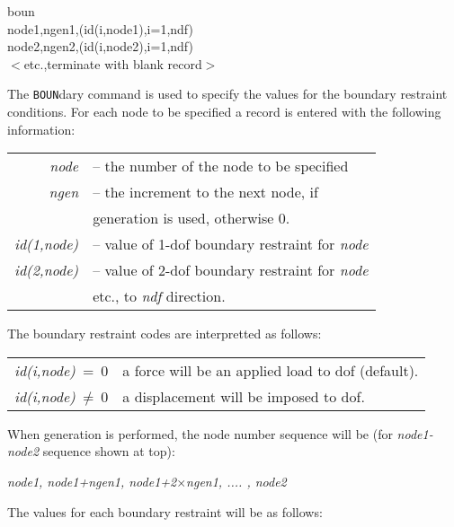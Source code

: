 \hspace{1.0cm} {{ boun \hfill}} \\{\smallskip}
\hspace{1.4cm} {{ node1,ngen1,(id(i,node1),i=1,ndf) \hfill}} \\{\smallskip}
\hspace{1.4cm} {{ node2,ngen2,(id(i,node2),i=1,ndf) \hfill}} \\{\smallskip}
\hspace{1.4cm} {{ $<$etc.,terminate with blank record$>$ \hfill}}
\headb

The {\tt BOUN}dary command is used to specify the values for
the boundary restraint conditions.  For each node to be
specified a record is entered with the following information:

\begin{center}
\begin{tabular}{r l}
\it node      &-- the number of the node to be specified \\
\it ngen      &-- the increment to the next node, if \\
              &  \quad generation is used, otherwise 0. \\
\it id(1,node)&-- value of 1-dof boundary restraint for {\it node} \\
\it id(2,node)&-- value of 2-dof boundary restraint for {\it node} \\
              &  \quad etc., to {\it ndf} direction.
\end{tabular}
\end{center}
The boundary restraint codes are interpretted as follows:

\begin{center}
\begin{tabular}{r l}
\it id(i,node)$~= ~0$   & a force will be an applied load to dof (default). \\
\it id(i,node)$~\ne ~0$ & a displacement will be imposed to dof.
\end{tabular}
\end{center}
When generation is performed, the node number sequence
will be (for {\it node1-node2} sequence shown at top):

\begin{center}
{\it node1, node1+ngen1, node1+2$\times$ngen1, .... , node2}
\end{center}
The values for each boundary restraint will be as follows:

